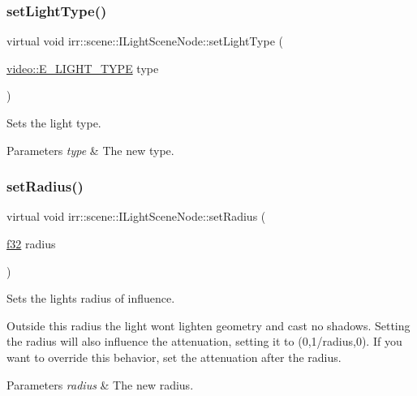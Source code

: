 \subsubsection{\texorpdfstring{set\+Light\+Type()}{setLightType()}\hspace{0.1cm}{\footnotesize\ttfamily [2/2]}}
{\footnotesize\ttfamily virtual void irr\+::scene\+::\+I\+Light\+Scene\+Node\+::set\+Light\+Type (\begin{DoxyParamCaption}\item[{\hyperlink{namespaceirr_1_1video_aaf0e02f6f83cc35cf9e764bf18400d39}{video\+::\+E\+\_\+\+L\+I\+G\+H\+T\+\_\+\+T\+Y\+PE}}]{type }\end{DoxyParamCaption})\hspace{0.3cm}{\ttfamily [pure virtual]}}



Sets the light type. 


\begin{DoxyParams}{Parameters}
{\em type} & The new type. \\
\hline
\end{DoxyParams}
\mbox{\label{classirr_1_1scene_1_1ILightSceneNode_a7da64c8c4776988a39927827f2c3f364}} 
\subsubsection{\texorpdfstring{set\+Radius()}{setRadius()}\hspace{0.1cm}{\footnotesize\ttfamily [1/2]}}
{\footnotesize\ttfamily virtual void irr\+::scene\+::\+I\+Light\+Scene\+Node\+::set\+Radius (\begin{DoxyParamCaption}\item[{\hyperlink{namespaceirr_a0277be98d67dc26ff93b1a6a1d086b07}{f32}}]{radius }\end{DoxyParamCaption})\hspace{0.3cm}{\ttfamily [pure virtual]}}



Sets the light\textquotesingle{}s radius of influence. 

Outside this radius the light won\textquotesingle{}t lighten geometry and cast no shadows. Setting the radius will also influence the attenuation, setting it to (0,1/radius,0). If you want to override this behavior, set the attenuation after the radius. 
\begin{DoxyParams}{Parameters}
{\em radius} & The new radius. \\
\hline
\end{DoxyParams}
\mbox{\label{classirr_1_1scene_1_1ILightSceneNode_a7da64c8c4776988a39927827f2c3f364}} 
